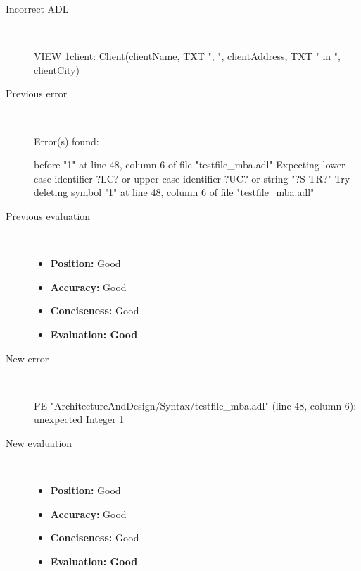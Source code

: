 \begin{description}
  \item[Incorrect ADL]~\\
\begin{adl}
VIEW 1client: Client(clientName, TXT ", ", clientAddress, TXT " in ", clientCity)\end{adl}
  \item[Previous error]~\\
\begin{haskell}
Error(s) found:

before "1" at line 48, column 6 of file "testfile_mba.adl"
Expecting lower case identifier ?LC? or upper case identifier ?UC? or string "?S
TR?"
Try deleting symbol "1" at line 48, column 6 of file "testfile_mba.adl"
\end{haskell}
  \item[Previous evaluation]~\\
    \begin{itemize}
    \item \textbf{Position:} Good
    \item \textbf{Accuracy:} Good
    \item \textbf{Conciseness:} Good
    \item \textbf{Evaluation: Good}
    \end{itemize}
  \item[New error]~\\
\begin{haskell}
PE "ArchitectureAndDesign/Syntax/testfile_mba.adl" (line 48, column 6):
unexpected Integer 1\end{haskell}
  \item[New evaluation]~\\
    \begin{itemize}
    \item \textbf{Position:} Good
    \item \textbf{Accuracy:} Good
    \item \textbf{Conciseness:} Good
    \item \textbf{Evaluation: Good}
    \end{itemize}
  \end{description}

\hrulefill

